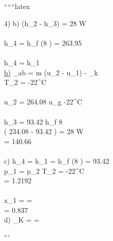 
``````latex


4) b) \quad {} (h_2 - h_3) = 28 W \\
 \\
h_4 = h_f (8 ) = 263.95  \\

 \quad {} \\

h_4 = h_1 \\

\underline{b)} \quad {}_{ab} = m (u_2 - u_1) - _k \\

T_2 = -22^\circ C \\

 \\

u_2 = 264.08  \quad u_g  -22^\circ C \\
 \\
h_3 = 93.42  \quad h_f  8  \\

 \left( 234.08  - 93.42  \right) = 28 W \\
= 140.66    \\
 \\

c) \quad h_4 = h_1 = h_f (8 ) = 93.42  \\

\quad p_1 = p_2 \quad {} T_2 = -22^\circ C \\
= 1.2192  \\
 \\
x_1 =  =  \\
= 0.837 \\

d) \quad \varepsilon_K =  =

```